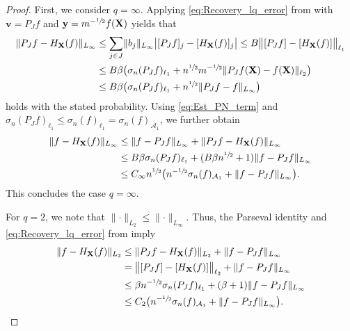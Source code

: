 \documentclass[11pt,reqno, a4paper]{article}
\numberwithin{equation}{section}
\begin{document}
\begin{proof}
First, we consider $q=\infty$.
Applying \eqref{eq:Recovery_lq_error} from  with $\mathbf{v} = P_Jf$ and $\mathbf{y} = m^{-\sfrac{1}{2}}f(\mathbf{X})$ yields that
\begin{align}\label{eq:Est_PN_term}
\begin{split}
    \lVert P_Jf - H_{\mathbf{X}}(f) \rVert_{L_\infty} &\leq \sum_{j\in J} \lVert b_j\rVert_{L_\infty} \big\lvert[P_Jf]_j - [H_{\mathbf{X}}(f)]_j \big\rvert \leq B \big\lVert[P_Jf] - [H_{\mathbf{X}} (f)]\big\rVert_{\ell_1}\\
    &\leq B\beta\big(\sigma_n(P_Jf)_{\ell_1} + n^{\sfrac{1}{2}} m^{-\sfrac{1}{2}} \lVert P_Jf(\mathbf{X}) - f(\mathbf{X})\rVert_{\ell_2}\big)\\
    &\leq B\beta\big(\sigma_n(P_Jf)_{\ell_1} + n^{\sfrac{1}{2}} \lVert P_Jf - f\rVert_{L_\infty}\big)
\end{split}
\end{align}
holds with the stated probability. Using \eqref{eq:Est_PN_term} and $ \sigma_n(P_Jf)_{\ell_1} \leq \sigma_n(f)_{\ell_1} = \sigma_n(f)_{\mathcal{A}_1}$, we further obtain
\begin{align}
\begin{split}
    \lVert f - H_{\mathbf{X}}(f)\rVert_{L_\infty} & \leq \lVert f - P_Jf \rVert_{L_\infty} + \lVert P_Jf - H_{\mathbf{X}}(f) \rVert_{L_\infty}\\
    &\leq B \beta \sigma_n(P_Jf)_{\ell_1} + (B\beta n^{\sfrac{1}{2}}+1)\lVert f - P_Jf\rVert_{L_\infty}\\
    &\leq C_{\infty} n^{\sfrac{1}{2}} \bigl(n^{-\sfrac{1}{2}}\sigma_n(f)_{\mathcal{A}_1} + \lVert f-P_Jf\rVert_{L_\infty} \bigr).
\end{split}
\end{align}
This concludes the case $q =\infty$.

For $q = 2$, we note that $\lVert\cdot\rVert_{L_2}\leq \lVert\cdot\rVert_{L_\infty}$.
Thus, the Parseval identity and \eqref{eq:Recovery_lq_error} from  imply
\begin{align}
\begin{split}
    \lVert f - H_{\mathbf{X}}(f)\rVert_{L_2} & \leq \lVert P_Jf -  H_{\mathbf{X}}(f)\rVert_{L_2} + \lVert f -P_Jf \rVert_{L_\infty}\\
    & = \bigl\lVert [P_Jf] - [H_{\mathbf{X}}(f)]\bigr\rVert_{\ell_2} + \lVert f - P_Jf \rVert_{L_\infty}\\
    &\leq \beta n^{-\sfrac{1}{2}}\sigma_n(P_Jf)_{\ell_1} + (\beta+1) \lVert f - P_Jf\rVert_{L_\infty}\\
    & \leq C_2 \big( n^{-\sfrac{1}{2}} \sigma_n(f)_{\mathcal{A}_1} + \lVert f-P_Jf\rVert_{L_\infty} \big).
\end{split}
\end{align}


\end{proof}
\end{document}
